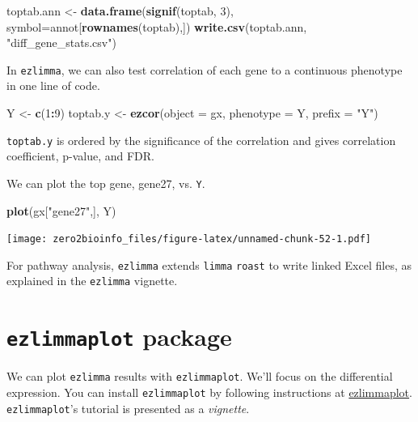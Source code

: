 \documentclass[]{article}
\newenvironment{Shaded}{\begin{snugshade}}{\end{snugshade}}
\newcommand{\KeywordTok}[1]{\textcolor[rgb]{0.13,0.29,0.53}{\textbf{#1}}}
\newcommand{\DataTypeTok}[1]{\textcolor[rgb]{0.13,0.29,0.53}{#1}}
\newcommand{\DecValTok}[1]{\textcolor[rgb]{0.00,0.00,0.81}{#1}}
\newcommand{\StringTok}[1]{\textcolor[rgb]{0.31,0.60,0.02}{#1}}
\newcommand{\OperatorTok}[1]{\textcolor[rgb]{0.81,0.36,0.00}{\textbf{#1}}}
\newcommand{\NormalTok}[1]{#1}
\begin{document}
\begin{Shaded}
\begin{Highlighting}[]
\NormalTok{toptab.ann <-}\StringTok{ }\KeywordTok{data.frame}\NormalTok{(}\KeywordTok{signif}\NormalTok{(toptab, }\DecValTok{3}\NormalTok{), }\DataTypeTok{symbol=}\NormalTok{annot[}\KeywordTok{rownames}\NormalTok{(toptab),])}
\KeywordTok{write.csv}\NormalTok{(toptab.ann, }\StringTok{"diff_gene_stats.csv"}\NormalTok{)}
\end{Highlighting}
\end{Shaded}

In \texttt{ezlimma}, we can also test correlation of each gene to a
continuous phenotype in one line of code.

\begin{Shaded}
\begin{Highlighting}[]
\NormalTok{Y <-}\StringTok{ }\KeywordTok{c}\NormalTok{(}\DecValTok{1}\OperatorTok{:}\DecValTok{9}\NormalTok{)}
\NormalTok{toptab.y <-}\StringTok{ }\KeywordTok{ezcor}\NormalTok{(}\DataTypeTok{object =}\NormalTok{ gx, }\DataTypeTok{phenotype =}\NormalTok{ Y, }\DataTypeTok{prefix =} \StringTok{"Y"}\NormalTok{)}
\end{Highlighting}
\end{Shaded}

\texttt{toptab.y} is ordered by the significance of the correlation and
gives correlation coefficient, p-value, and FDR.

We can plot the top gene, gene27, vs. \texttt{Y}.

\begin{Shaded}
\begin{Highlighting}[]
\KeywordTok{plot}\NormalTok{(gx[}\StringTok{"gene27"}\NormalTok{,], Y)}
\end{Highlighting}
\end{Shaded}

\texttt{[image: zero2bioinfo\_files/figure-latex/unnamed-chunk-52-1.pdf]}

For pathway analysis, \texttt{ezlimma} extends \texttt{limma}
\texttt{roast} to write linked Excel files, as explained in the
\texttt{ezlimma} vignette.

\section{\texorpdfstring{\texttt{ezlimmaplot}
package}{ezlimmaplot package}}\label{ezlimmaplot-package}

We can plot \texttt{ezlimma} results with \texttt{ezlimmaplot}. We'll
focus on the differential expression. You can install
\texttt{ezlimmaplot} by following instructions at
\href{https://github.com/jdreyf/ezlimmaplot}{ezlimmaplot}.
\texttt{ezlimmaplot}'s tutorial is presented as a \emph{vignette}.
\end{document}
